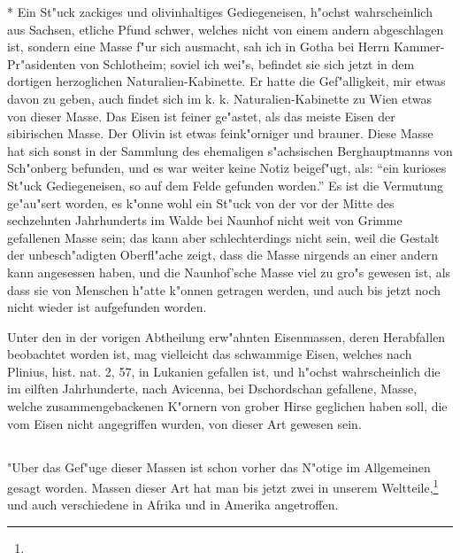 \documentclass[a4paper, 11pt, oneside, polutonikogreek, german]{article}
\begin{document}
* Ein St"uck zackiges und olivinhaltiges Gediegeneisen, h"ochst wahrscheinlich aus Sachsen, etliche Pfund schwer, welches nicht von einem andern abgeschlagen ist, sondern eine Masse f"ur sich ausmacht, sah ich in Gotha bei Herrn Kammer-Pr"asidenten von Schlotheim; soviel ich wei"s, befindet sie sich jetzt in dem dortigen herzoglichen Naturalien-Kabinette. Er hatte die Gef"alligkeit, mir etwas davon zu geben, auch findet sich im k. k. Naturalien-Kabinette zu Wien etwas von dieser Masse. Das Eisen ist feiner ge"astet, als das meiste Eisen der sibirischen Masse. Der Olivin ist etwas feink"orniger und brauner. Diese Masse hat sich sonst in der Sammlung des ehemaligen s"achsischen Berghauptmanns von Sch"onberg befunden, und es war weiter keine Notiz beigef"ugt, als: "`ein kurioses St"uck Gediegeneisen, so auf dem Felde gefunden worden."' Es ist die Vermutung ge"au"sert worden, es k"onne wohl ein St"uck von der vor der Mitte des sechzehnten Jahrhunderts im Walde bei Naunhof nicht weit von Grimme gefallenen Masse sein; das kann aber schlechterdings nicht sein, weil die Gestalt der unbesch"adigten Oberfl"ache zeigt, dass die Masse nirgends an einer andern kann angesessen haben, und die Naunhof'sche Masse viel zu gro"s gewesen ist, als dass sie von Menschen h"atte k"onnen getragen werden, und auch bis jetzt noch nicht wieder ist aufgefunden worden.

Unter den in der vorigen Abtheilung erw"ahnten Eisenmassen, deren Herabfallen beobachtet worden ist, mag vielleicht das schwammige Eisen, welches nach Plinius, hist. nat. 2, 57, in Lukanien gefallen ist, und h"ochst wahrscheinlich die im eilften Jahrhunderte, nach Avicenna, bei Dschordschan gefallene, Masse, welche zusammengebackenen K"ornern von grober Hirse geglichen haben soll, die vom Eisen nicht angegriffen wurden, von dieser Art gewesen sein.
\subsection{}
\paragraph{}
"Uber das Gef"uge dieser Massen ist schon vorher das N"otige im Allgemeinen gesagt worden. Massen dieser Art hat man bis jetzt zwei in unserem Weltteile,\footnote{} und auch verschiedene in Afrika und in Amerika angetroffen.
\end{document}
